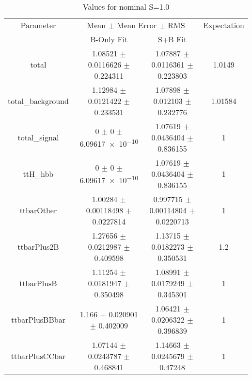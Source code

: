 \begin{table}
\centering
\caption{Values for nominal S=1.0}
\begin{tabular}{cccc}
\toprule
Parameter & \multicolumn{2}{c}{Mean $\pm$ Mean Error $\pm$ RMS} & Expectation\\
 & B-Only Fit & S+B Fit & \\
\midrule
total & \num{1.08521} $\pm$ \num{0.0116626} $\pm$ \num{0.224311} & \num{1.07887} $\pm$ \num{0.0116361} $\pm$ \num{0.223803} & \num{1.0149}\\
total\_background & \num{1.12984} $\pm$ \num{0.0121422} $\pm$ \num{0.233531} & \num{1.07898} $\pm$ \num{0.012103} $\pm$ \num{0.232776} & \num{1.01584}\\
total\_signal & \num{0} $\pm$ \num{0} $\pm$ \num{6.09617e-10} & \num{1.07619} $\pm$ \num{0.0436404} $\pm$ \num{0.836155} & \num{1}\\
ttH\_hbb & \num{0} $\pm$ \num{0} $\pm$ \num{6.09617e-10} & \num{1.07619} $\pm$ \num{0.0436404} $\pm$ \num{0.836155} & \num{1}\\
ttbarOther & \num{1.00284} $\pm$ \num{0.00118498} $\pm$ \num{0.0227814} & \num{0.997715} $\pm$ \num{0.00114804} $\pm$ \num{0.0220713} & \num{1}\\
ttbarPlus2B & \num{1.27656} $\pm$ \num{0.0212987} $\pm$ \num{0.409598} & \num{1.13715} $\pm$ \num{0.0182273} $\pm$ \num{0.350531} & \num{1.2}\\
ttbarPlusB & \num{1.11254} $\pm$ \num{0.0181947} $\pm$ \num{0.350498} & \num{1.08991} $\pm$ \num{0.0179249} $\pm$ \num{0.345301} & \num{1}\\
ttbarPlusBBbar & \num{1.166} $\pm$ \num{0.020901} $\pm$ \num{0.402009} & \num{1.06421} $\pm$ \num{0.0206322} $\pm$ \num{0.396839} & \num{1}\\
ttbarPlusCCbar & \num{1.07144} $\pm$ \num{0.0243787} $\pm$ \num{0.468841} & \num{1.14663} $\pm$ \num{0.0245679} $\pm$ \num{0.47248} & \num{1}\\
\bottomrule
\end{tabular}
\end{table}